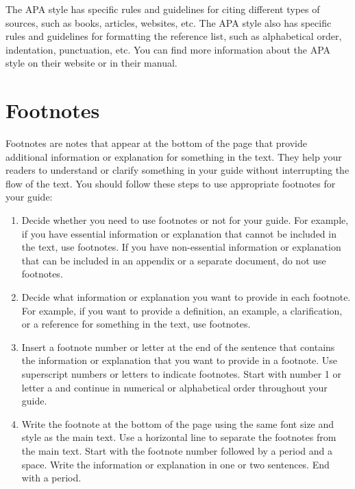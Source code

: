 \documentclass[12pt]{article}
\begin{document}
The APA style has specific rules and guidelines for citing different types of sources, such as books, articles, websites, etc. The APA style also has specific rules and guidelines for formatting the reference list, such as alphabetical order, indentation, punctuation, etc. You can find more information about the APA style on their website or in their manual.

\pagebreak

\section{Footnotes}

Footnotes are notes that appear at the bottom of the page that provide additional information or explanation for something in the text. They help your readers to understand or clarify something in your guide without interrupting the flow of the text. You should follow these steps to use appropriate footnotes for your guide:

\begin{enumerate}
    \item Decide whether you need to use footnotes or not for your guide. For example, if you have essential information or explanation that cannot be included in the text, use footnotes. If you have non-essential information or explanation that can be included in an appendix or a separate document, do not use footnotes.
    \item Decide what information or explanation you want to provide in each footnote. For example, if you want to provide a definition, an example, a clarification, or a reference for something in the text, use footnotes.
    \item Insert a footnote number or letter at the end of the sentence that contains the information or explanation that you want to provide in a footnote. Use superscript numbers or letters to indicate footnotes. Start with number 1 or letter a and continue in numerical or alphabetical order throughout your guide.
    \item Write the footnote at the bottom of the page using the same font size and style as the main text. Use a horizontal line to separate the footnotes from the main text. Start with the footnote number followed by a period and a space. Write the information or explanation in one or two sentences. End with a period.
\end{enumerate}

\pagebreak

\printbibliography
\end{document}
